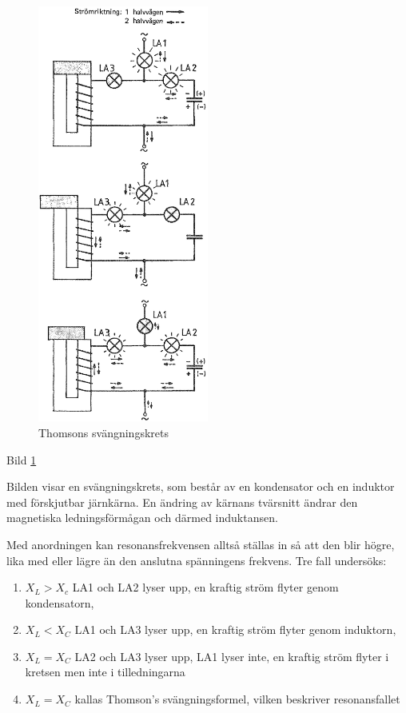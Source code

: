 \begin{figure}
\includegraphics[width=0.5\textwidth]{images/bild_2_3-17.png}
\caption{Thomsons svängningskrets}
\label{fig:BildII3-17}
\end{figure}

Bild \ref{fig:BildII3-17}

Bilden visar en svängningskrets, som består av en kondensator och en induktor
med förskjutbar järnkärna. En ändring av kärnans tvärsnitt ändrar den
magnetiska ledningsförmågan och därmed induktansen.

Med anordningen kan resonansfrekvensen alltså ställas in så att den blir högre,
lika med eller lägre än den anslutna spänningens frekvens. Tre fall undersöks:
\begin{enumerate}
\item \(X_L > X_c\) LA1 och LA2 lyser upp, en kraftig ström flyter genom
  kondensatorn,
\item \(X_L < X_C\) LA1 och LA3 lyser upp, en kraftig ström flyter genom
  induktorn,
\item \(X_L= X_C\) LA2 och LA3 lyser upp, LA1 lyser inte, en kraftig ström
  flyter i kretsen men inte i tilledningarna
\item \(X_L = X_C\) kallas Thomson's svängningsformel, vilken beskriver
  resonansfallet
\end{enumerate}

